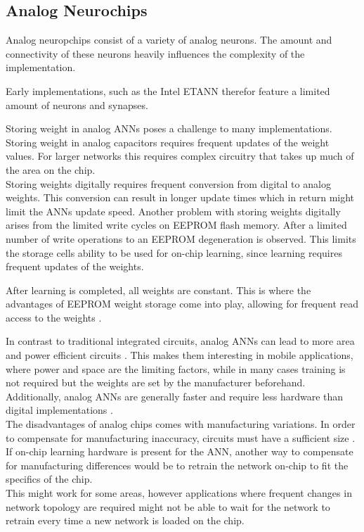 \documentclass[conference]{IEEEtran}
\begin{document}


    \subsection{Analog Neurochips}

    Analog neuropchips consist of a variety of analog neurons.
    The amount and connectivity of these neurons heavily influences the complexity of the implementation.

    Early implementations, such as the Intel ETANN therefor feature a limited amount of neurons and synapses.

    Storing weight in analog ANNs poses a challenge to many implementations.
    Storing weight in analog capacitors requires frequent updates of the weight values.
    For larger networks this requires complex circuitry that takes up much of the area on the chip.
    \\
    Storing weights digitally requires frequent conversion from digital to analog weights.
    This conversion can result in longer update times which in return might limit the ANNs update speed.
    Another problem with storing weights digitally arises from the limited write cycles on EEPROM flash memory.
    After a limited number of write operations to an EEPROM degeneration is observed.
    This limits the storage cells ability to be used for on-chip learning, since learning requires frequent updates of the weights.

    After learning is completed, all weights are constant.
    This is where the advantages of EEPROM weight storage come into play, allowing for frequent read access to the weights \cite{holler1989electrically}.


    In contrast to traditional integrated circuits, analog ANNs can lead to more area and power efficient circuits \cite{forssell2014hardware}.
    This makes them interesting in mobile applications, where power and space are the limiting factors, while in many cases training is not required but the weights are set by the manufacturer beforehand.
    Additionally, analog ANNs are generally faster and require less hardware than digital implementations \cite{hollis1990artificial}.\\

    The disadvantages of analog chips comes with manufacturing variations.
    In order to compensate for manufacturing inaccuracy, circuits must have a sufficient size \cite{forssell2014hardware}.
    If on-chip learning hardware is present for the ANN, another way to compensate for manufacturing differences would be to retrain the network on-chip to fit the specifics of the chip.\\
    This might work for some areas, however applications where frequent changes in network topology are required might not be able to wait for the network to retrain every time a new network is loaded on the chip.
\end{document}
